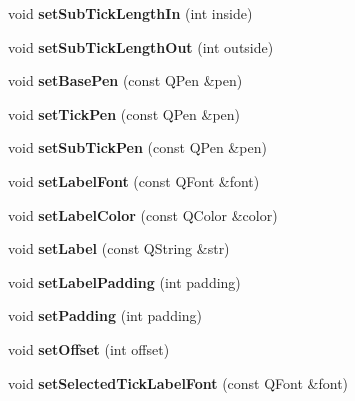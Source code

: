 \begin{DoxyCompactItemize}
void {\bfseries set\+Sub\+Tick\+Length\+In} (int inside)
\item 
\mbox{\label{class_q_c_p_axis_a4c6dfc3963492ed72a77724012df5f23}} 
void {\bfseries set\+Sub\+Tick\+Length\+Out} (int outside)
\item 
\mbox{\label{class_q_c_p_axis_a778d45fb71b3c7ab3bb7079e18b058e4}} 
void {\bfseries set\+Base\+Pen} (const Q\+Pen \&pen)
\item 
\mbox{\label{class_q_c_p_axis_ad80923bcc1c5da4c4db602c5325e797e}} 
void {\bfseries set\+Tick\+Pen} (const Q\+Pen \&pen)
\item 
\mbox{\label{class_q_c_p_axis_aede4028ae7516bd51a60618a8233f9cf}} 
void {\bfseries set\+Sub\+Tick\+Pen} (const Q\+Pen \&pen)
\item 
\mbox{\label{class_q_c_p_axis_a71ac1a47f7547e490a8c4311d1433cf3}} 
void {\bfseries set\+Label\+Font} (const Q\+Font \&font)
\item 
\mbox{\label{class_q_c_p_axis_a6c906fe56d75f0122335b9f79b999608}} 
void {\bfseries set\+Label\+Color} (const Q\+Color \&color)
\item 
\mbox{\label{class_q_c_p_axis_a33bcc382c111c9f31bb0687352a2dea4}} 
void {\bfseries set\+Label} (const Q\+String \&str)
\item 
\mbox{\label{class_q_c_p_axis_a4391192a766e5d20cfe5cbc17607a7a2}} 
void {\bfseries set\+Label\+Padding} (int padding)
\item 
\mbox{\label{class_q_c_p_axis_a5691441cb3de9e9844855d339c0db279}} 
void {\bfseries set\+Padding} (int padding)
\item 
\mbox{\label{class_q_c_p_axis_a04a652603cbe50eba9969ee6d68873c3}} 
void {\bfseries set\+Offset} (int offset)
\item 
\mbox{\label{class_q_c_p_axis_a845ccb560b7bc5281098a5be494145f6}} 
void {\bfseries set\+Selected\+Tick\+Label\+Font} (const Q\+Font \&font)

\end{DoxyCompactItemize}
